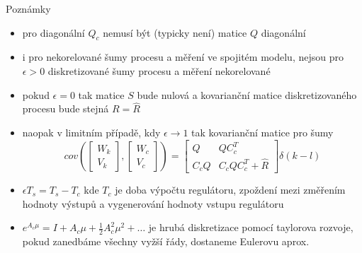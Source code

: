 Poznámky
\begin{itemize}
  \item pro diagonální $Q_c$ nemusí být (typicky není) matice $Q$ diagonální
  \item i pro nekorelované šumy procesu a měření ve spojitém modelu, nejsou pro $\epsilon > 0$ diskretizované šumy procesu a měření nekorelované
  \item pokud $\epsilon =0$ tak matice $S$ bude nulová a kovarianční matice diskretizovaného procesu bude stejná $R = \hat{R}$
  \item naopak v limitním případě, kdy $\epsilon \to 1$ tak kovarianční matice pro šumy \[ cov(\begin{bmatrix}W_k \\ V_k \end{bmatrix}, \begin{bmatrix}W_c \\ V_c \end{bmatrix} ) = \begin{bmatrix} Q & Q C_c^T \\ C_c Q & C_c Q C_c^T + \hat{R} \end{bmatrix} \delta(k-l) \]
  \item $\epsilon T_s = T_s - T_c$ kde $T_c$ je doba výpočtu regulátoru, zpoždení mezi změřením hodnoty výstupů a vygenerování hodnoty vstupu regulátoru
  \item $e^{A_c \mu} = I + A_c \mu + \frac{1}{2} A_c^2 \mu^2 + \ldots$ je hrubá diskretizace pomocí taylorova rozvoje, pokud zanedbáme všechny vyžší řády, dostaneme Eulerovu aprox.
\end{itemize}

